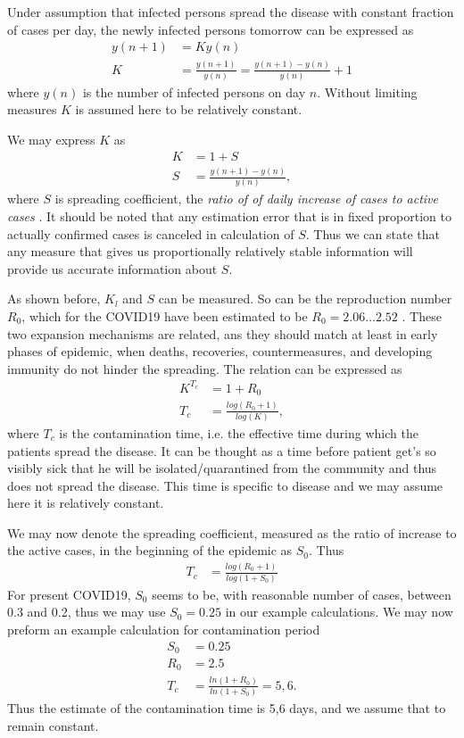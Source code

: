 Under assumption that infected persons spread the disease with constant
fraction of cases per day, the newly infected persons tomorrow can be
expressed as
\begin{align}
    y\left(n+1\right)&=K y\left(n\right)\\
    K&= \frac{y\left(n+1\right)}{y\left(n\right)}=
    \frac{y\left(n+1\right)-y\left(n\right)}{y\left(n\right)}+1
\end{align}
where $y\left(n\right)$ is the number of infected persons on day $n$. Without
limiting measures $K$ is assumed here to be relatively constant. 

We may express $K$ as
\begin{align}
    K&= 1+S\\
    S &= \frac{y\left(n+1\right)-y\left(n\right)}{y\left(n\right)},
\end{align}
where $S$ is spreading coefficient, the \emph{ ratio of of daily increase of
    cases  to
active cases }. It should be noted that any estimation error that is in fixed
proportion to actually confirmed cases is canceled in calculation of $S$. Thus
we can state that any measure that gives us proportionally relatively stable
information will provide us accurate information about $S$.

As shown before, $K_l$ and $S$ can be measured. So can be the reproduction
number $R_0$, which for the COVID19 have been estimated to be $R_0=2.06 \ldots
2.52$ \cite{Zhang_S2020}.
These two expansion mechanisms are related, ans they should match at least in early phases of
epidemic, when deaths, recoveries, countermeasures, and developing immunity do not hinder the
spreading. The relation can be expressed as 
\begin{align}
    K^{T_c}&= 1+R_0\\
    T_c&=\frac{log\left(R_0+1\right)}{log\left(K\right)},
\end{align}
where $T_c$ is the contamination time, i.e. the effective time during which the patients
spread the disease. It can be thought as a time before patient get's so
visibly sick that he will be isolated/quarantined from the community and thus
does not spread the disease. This time is specific to disease and we may
assume here it is relatively constant.

We may now denote the spreading coefficient, measured as the ratio of increase
to the active cases, in the beginning of the epidemic as $S_0$. Thus
\begin{align}
    T_c&=\frac{log\left(R_0+1\right)}{log\left(1+S_0\right)}
\end{align}
For present COVID19, $S_0$ seems to be, with reasonable number of cases,
between 0.3 and 0.2, thus we may use $S_0=0.25$ in our example
calculations. We may now preform an example calculation for contamination
period 
\begin{align}
    S_0&=0.25\\
    R_0&=2.5\\
    T_c&=\frac{ln\left(1+R_0\right)}{ln\left(1+S_0\right)}=5,6.
\end{align}
Thus the estimate of the contamination time is 5,6 days, and we assume that to
remain constant.

